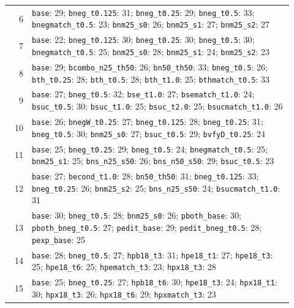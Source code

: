 \begin{table}[h]
{\begin{tabular}{rp{0.92\linewidth}}
6 & \texttt{base}: 29; \texttt{bneg\_t0.125}: 31; \texttt{bneg\_t0.25}: 29; \texttt{bneg\_t0.5}: 33; \texttt{bnegmatch\_t0.5}: 23; \texttt{bnm25\_s0}: 26; \texttt{bnm25\_s1}: 27; \texttt{bnm25\_s2}: 27 \\
7 & \texttt{base}: 22; \texttt{bneg\_t0.125}: 30; \texttt{bneg\_t0.25}: 30; \texttt{bneg\_t0.5}: 30; \texttt{bnegmatch\_t0.5}: 25; \texttt{bnm25\_s0}: 28; \texttt{bnm25\_s1}: 24; \texttt{bnm25\_s2}: 23 \\
8 & \texttt{base}: 29; \texttt{bcombo\_n25\_th50}: 26; \texttt{bn50\_th50}: 33; \texttt{bneg\_t0.5}: 26; \texttt{bth\_t0.25}: 28; \texttt{bth\_t0.5}: 28; \texttt{bth\_t1.0}: 25; \texttt{bthmatch\_t0.5}: 33 \\
9 & \texttt{base}: 27; \texttt{bneg\_t0.5}: 32; \texttt{bse\_t1.0}: 27; \texttt{bsematch\_t1.0}: 24; \texttt{bsuc\_t0.5}: 30; \texttt{bsuc\_t1.0}: 25; \texttt{bsuc\_t2.0}: 25; \texttt{bsucmatch\_t1.0}: 26 \\
10 & \texttt{base}: 26; \texttt{bnegW\_t0.25}: 27; \texttt{bneg\_t0.125}: 28; \texttt{bneg\_t0.25}: 31; \texttt{bneg\_t0.5}: 30; \texttt{bnm25\_s0}: 27; \texttt{bsuc\_t0.5}: 29; \texttt{bvfyD\_t0.25}: 24 \\
11 & \texttt{base}: 25; \texttt{bneg\_t0.25}: 29; \texttt{bneg\_t0.5}: 24; \texttt{bnegmatch\_t0.5}: 25; \texttt{bnm25\_s1}: 25; \texttt{bns\_n25\_s50}: 26; \texttt{bns\_n50\_s50}: 29; \texttt{bsuc\_t0.5}: 23 \\
12 & \texttt{base}: 27; \texttt{becond\_t1.0}: 28; \texttt{bn50\_th50}: 31; \texttt{bneg\_t0.125}: 33; \texttt{bneg\_t0.25}: 26; \texttt{bnm25\_s2}: 25; \texttt{bns\_n25\_s50}: 24; \texttt{bsucmatch\_t1.0}: 31 \\
13 & \texttt{base}: 30; \texttt{bneg\_t0.5}: 28; \texttt{bnm25\_s0}: 26; \texttt{pboth\_base}: 30; \texttt{pboth\_bneg\_t0.5}: 27; \texttt{pedit\_base}: 29; \texttt{pedit\_bneg\_t0.5}: 28; \texttt{pexp\_base}: 25 \\
14 & \texttt{base}: 28; \texttt{bneg\_t0.5}: 27; \texttt{hpb18\_t3}: 31; \texttt{hpe18\_t1}: 27; \texttt{hpe18\_t3}: 25; \texttt{hpe18\_t6}: 25; \texttt{hpematch\_t3}: 23; \texttt{hpx18\_t3}: 28 \\
15 & \texttt{base}: 25; \texttt{bneg\_t0.25}: 27; \texttt{hpb18\_t6}: 30; \texttt{hpe18\_t3}: 24; \texttt{hpx18\_t1}: 30; \texttt{hpx18\_t3}: 26; \texttt{hpx18\_t6}: 29; \texttt{hpxmatch\_t3}: 23 \\
\bottomrule
\end{tabular}}
\end{table}

